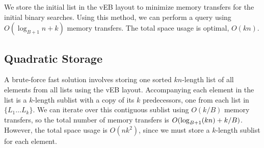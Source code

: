 We store the initial list in the vEB layout to minimize memory transfers for the 
initial binary searches. Using this method, we can perform a query using 
$O(\log_{B+1} n + k)$ memory transfers. The total space usage is optimal, $O(kn)$.

\subsection*{Quadratic Storage}
A brute-force fast solution involves storing one sorted $kn$-length list 
of all elements from all lists using the vEB layout. Accompanying each element in the list is 
a $k$-length sublist with a copy of its $k$ predecessors, 
one from each list in $\{ L_1 \ldots L_k \}$. 
We can iterate over this contiguous sublist using $O(k/B)$ memory transfers, 
so the total number of memory transfers is $O(\log_{B+1} \mathopen{}\left(kn\right)\mathclose{} + k/B)$. However, the
total space usage is $O(nk^2)$, since we must store a $k$-length sublist for each element.




